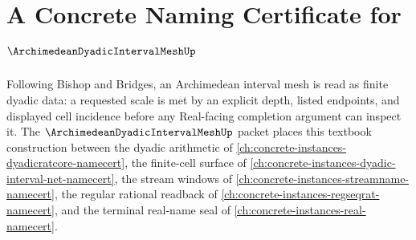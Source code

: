 \chapter{A Concrete Naming Certificate for $\ArchimedeanDyadicIntervalMeshUp$}
\label{ch:concrete-instances-archimedean-dyadic-interval-mesh-namecert}

Following Bishop and Bridges, an Archimedean interval mesh is read as finite dyadic data: a requested scale is met by an explicit depth, listed endpoints, and displayed cell incidence before any Real-facing completion argument can inspect it. The $\ArchimedeanDyadicIntervalMeshUp$ packet places this textbook construction between the dyadic arithmetic of \autoref{ch:concrete-instances-dyadicratcore-namecert}, the finite-cell surface of \autoref{ch:concrete-instances-dyadic-interval-net-namecert}, the stream windows of \autoref{ch:concrete-instances-streamname-namecert}, the regular rational readback of \autoref{ch:concrete-instances-regseqrat-namecert}, and the terminal real-name seal of \autoref{ch:concrete-instances-real-namecert}.

